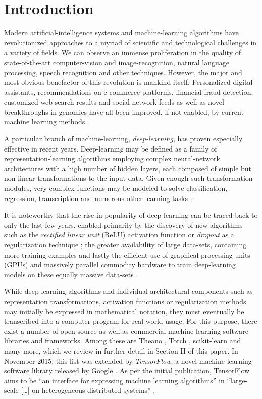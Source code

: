 \section{Introduction}

Modern artificial-intelligence systems and machine-learning algorithms have
revolutionized approaches to a myriad of scientific and technological challenges
in a variety of fields. We can observe an immense proliferation in the quality
of state-of-the-art computer-vision and image-recognition, natural language
processing, speech recognition and other techniques. However, the major and most
obvious benefactor of this revolution is mankind itself. Personalized digital
assistants, recommendations on e-commerce platforms, financial fraud detection,
customized web-search results and social-network feeds as well as novel
breakthroughs in genomics have all been improved, if not enabled, by current
machine learning methods.

A particular branch of machine-learning, \emph{deep-learning}, has proven
especially effective in recent years. Deep-learning may be defined as a family
of representation-learning algorithms employing complex neural-network
architectures with a high number of hidden layers, each composed of simple but
non-linear transformations to the input data. Given enough such transformation
modules, very complex functions may be modeled to solve classification,
regression, transcription and numerous other learning tasks \cite{nature2015}.

It is noteworthy that the rise in popularity of deep-learning can be traced back
to only the last few years, enabled primarily by the discovery of new algorithms
such as the \emph{rectified linear unit} (ReLU) \cite{relu} activation function
or \emph{dropout} as a regularization technique \cite{dropout}; the greater
availability of large data-sets, containing more training examples and lastly
the efficient use of graphical processing units (GPUs) and massively parallel
commodity hardware to train deep-learning models on these equally massive
data-sets \cite{nature2015, rampasek}.

While deep-learning algorithms and individual architectural components such as
representation transformations, activation functions or regularization methods
may initially be expressed in mathematical notation, they must eventually be
transcribed into a computer program for real-world usage. For this purpose,
there exist a number of open-source as well as commercial machine-learning
software libraries and frameworks. Among these are Theano \cite{theano}, Torch
\cite{torch}, scikit-learn \cite{scikit} and many more, which we review in
further detail in Section II of this paper. In November 2015, this list was
extended by \emph{TensorFlow}, a novel machine-learning software library
released by Google \cite{tensorflow}. As per the initial publication, TensorFlow
aims to be ``an interface for expressing machine learning algorithms'' in
``large-scale [\dots] on heterogeneous distributed systems'' \cite{tensorflow}.


